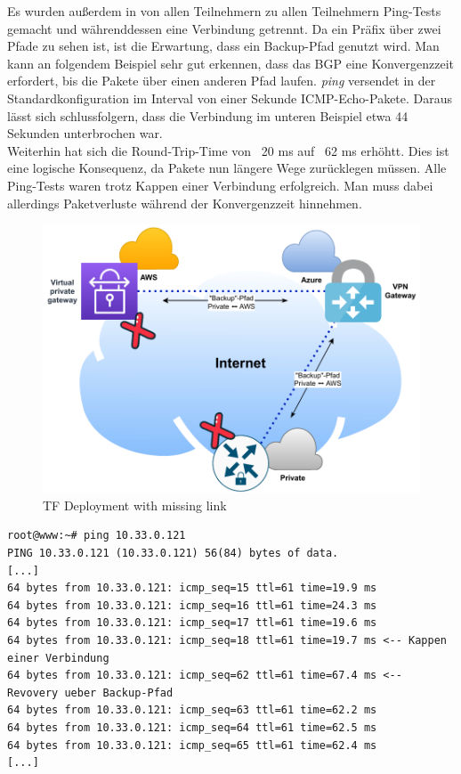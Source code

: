
Es wurden außerdem in von allen Teilnehmern zu allen Teilnehmern Ping-Tests gemacht und währenddessen eine Verbindung getrennt. Da ein Präfix über zwei Pfade zu sehen ist, ist die Erwartung, dass ein Backup-Pfad genutzt wird. Man kann an folgendem Beispiel sehr gut erkennen, dass das BGP eine Konvergenzzeit erfordert, bis die Pakete über einen anderen Pfad laufen. \textit{ping} versendet in der Standardkonfiguration im Interval von einer Sekunde ICMP-Echo-Pakete. Daraus lässt sich schlussfolgern, dass die Verbindung im unteren Beispiel etwa 44 Sekunden unterbrochen war.\\
Weiterhin hat sich die Round-Trip-Time von ~20 ms auf ~62 ms erhöhtt. Dies ist eine logische Konsequenz, da Pakete nun längere Wege zurücklegen müssen. Alle Ping-Tests waren trotz Kappen einer Verbindung erfolgreich. Man muss dabei allerdings Paketverluste während der Konvergenzzeit hinnehmen.

\begin{figure}[h]
  \centering
  \includegraphics{Figures/Use-Case-1_Basis_Deployment_missing_link.pdf}
  \caption{TF Deployment with missing link}
  \label{grafik:Use-Case-1_Basis_Deployment_missing_link}
\end{figure}

\begin{lstlisting}[label=tf-base-deployment-ping-ok,caption=Ping Tests zwischen verschiedenen Cloud-Plattformen mit Kappen einer Backbone-Verbindung.]
root@www:~# ping 10.33.0.121
PING 10.33.0.121 (10.33.0.121) 56(84) bytes of data.
[...]
64 bytes from 10.33.0.121: icmp_seq=15 ttl=61 time=19.9 ms
64 bytes from 10.33.0.121: icmp_seq=16 ttl=61 time=24.3 ms
64 bytes from 10.33.0.121: icmp_seq=17 ttl=61 time=19.6 ms
64 bytes from 10.33.0.121: icmp_seq=18 ttl=61 time=19.7 ms <-- Kappen einer Verbindung
64 bytes from 10.33.0.121: icmp_seq=62 ttl=61 time=67.4 ms <-- Revovery ueber Backup-Pfad
64 bytes from 10.33.0.121: icmp_seq=63 ttl=61 time=62.2 ms
64 bytes from 10.33.0.121: icmp_seq=64 ttl=61 time=62.5 ms
64 bytes from 10.33.0.121: icmp_seq=65 ttl=61 time=62.4 ms
[...]
\end{lstlisting}

